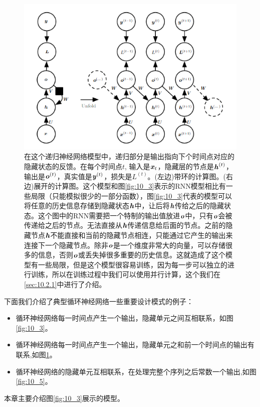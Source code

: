 \begin{figure}[htbp] %
   \centering
   \includegraphics[width=6in]{fig/chap10/10_4.PNG} 
   \caption{在这个递归神经网络模型中，递归部分是输出指向下个时间点对应的隐藏状态的反馈。在每个时间点$t$, 输入是$\boldsymbol{\mathit{x}}_t$，隐藏层的节点是$\boldsymbol{\mathit{h}}^{(t)}$，输出是$\boldsymbol{\mathit{o}}^{(t)}$，真实值是$\boldsymbol{\mathit{y}}^{(t)}$，损失是$L^{(t)}$。(左边)带环的计算图。(右边)展开的计算图。这个模型和图\ref{fig:10_3}表示的RNN模型相比有一些局限（只能模拟很少的一部分函数），图\ref{fig:10_3}代表的模型可以将任意的历史信息存储到隐藏状态$\boldsymbol{\mathit{h}}$中，让后将$\boldsymbol{\mathit{h}}$传给之后的隐藏状态。这个图中的RNN需要把一个特制的输出值放进$\boldsymbol{\mathit{o}}$中，只有$\boldsymbol{\mathit{o}}$会被传递给之后的节点。无法直接从$\boldsymbol{\mathit{h}}$传递信息给后面的节点。之前的隐藏节点$\boldsymbol{\mathit{h}}$不能直接和当前的隐藏节点相连，只能通过它产生的输出来连接下一个隐藏节点。除非$\boldsymbol{\mathit{o}}$是一个维度非常大的向量，可以存储很多的信息，否则$\boldsymbol{\mathit{o}}$或丢失掉很多重要的历史信息。这就造成了这个模型有一些局限，但是这个模型很容易训练，因为每一步可以独立的进行训练，所以在训练过程中我们可以使用并行计算，这个我们在\ref{sec:10.2.1}中进行了介绍。}
   \label{fig:10_4}
\end{figure}

下面我们介绍了典型循环神经网络一些重要设计模式的例子：
\begin{itemize}
\item 循环神经网络每一时间点产生一个输出，隐藏单元之间互相联系，如图\ref{fig:10_3}。
\item 循环神经网络每一时间点产生一个输出，隐藏单元之和前一个时间点的输出有联系,如图\ref{fig:10_4}。
\item 循环神经网络的隐藏单元互相联系，在处理完整个序列之后常数一个输出,如图\ref{fig:10_5}。

\end{itemize}
本章主要介绍图\ref{fig:10_3}展示的模型。

